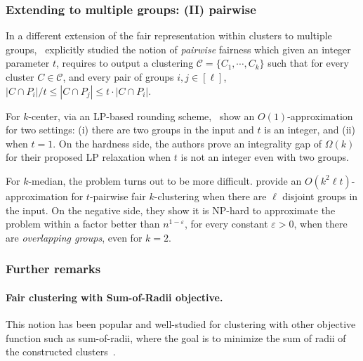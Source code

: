 \subsubsection{Extending to multiple groups: (II) pairwise}
In a different extension of the fair representation within clusters to multiple groups,~\cite{bandyapadhyay2024polynomial,bandyapadhyay2025constant} explicitly studied the notion of {\em pairwise} fairness which given an integer parameter $t$, requires to output a clustering $\mathcal{C}=\{C_1,\cdots,C_k\}$ such that for every cluster $C\in \mathcal{C}$, and every pair of groups $i,j\in [\ell]$, $|C\cap P_i| /t\le |C\cap P_j| \le t\cdot |C\cap P_i|$.

For $k$-center, via an LP-based rounding scheme,~\citet{bandyapadhyay2025constant} show an $O(1)$-approximation for two settings: (i) there are two groups in the input and $t$ is an integer, and (ii) when $t=1$. On the hardness side, the authors prove an integrality gap of $\Omega(k)$ for their proposed LP relaxation when $t$ is not an integer even with two groups. 

For $k$-median, the problem turns out to be more difficult. \citet{bandyapadhyay2024polynomial} provide an $O(k^2 \ell t)$-approximation for $t$-pairwise fair $k$-clustering when there are $\ell$ disjoint groups in the input. On the negative side, they show it is NP-hard to approximate the problem within a factor better than $n^{1-\varepsilon}$, for every constant $\varepsilon>0$, when there are {\em overlapping groups}, even for $k=2$.



\subsubsection{Further remarks}
\paragraph{Fair clustering with Sum-of-Radii objective.} This notion has been popular and well-studied for clustering with other objective function such as sum-of-radii, where the goal is to minimize the sum of radii of the constructed clusters~\citep{carta2024fpt,nezhad2025polynomial}. 
    
